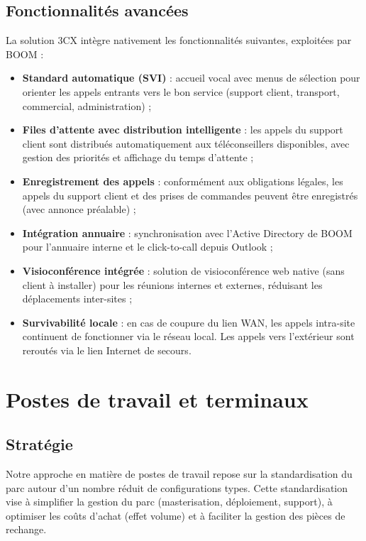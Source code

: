 \documentclass[12pt,a4paper]{report}
\begin{document}
\section{Fonctionnalités avancées}

La solution 3CX intègre nativement les fonctionnalités suivantes, exploitées par BOOM :

\begin{itemize}
\item \textbf{Standard automatique (SVI)} : accueil vocal avec menus de sélection pour orienter les appels entrants vers le bon service (support client, transport, commercial, administration) ;
\item \textbf{Files d'attente avec distribution intelligente} : les appels du support client sont distribués automatiquement aux téléconseillers disponibles, avec gestion des priorités et affichage du temps d'attente ;
\item \textbf{Enregistrement des appels} : conformément aux obligations légales, les appels du support client et des prises de commandes peuvent être enregistrés (avec annonce préalable) ;
\item \textbf{Intégration annuaire} : synchronisation avec l'Active Directory de BOOM pour l'annuaire interne et le click-to-call depuis Outlook ;
\item \textbf{Visioconférence intégrée} : solution de visioconférence web native (sans client à installer) pour les réunions internes et externes, réduisant les déplacements inter-sites ;
\item \textbf{Survivabilité locale} : en cas de coupure du lien WAN, les appels intra-site continuent de fonctionner via le réseau local. Les appels vers l'extérieur sont reroutés via le lien Internet de secours.
\end{itemize}


\chapter{Postes de travail et terminaux}

\section{Stratégie}

Notre approche en matière de postes de travail repose sur la standardisation du parc autour d'un nombre réduit de configurations types. Cette standardisation vise à simplifier la gestion du parc (masterisation, déploiement, support), à optimiser les coûts d'achat (effet volume) et à faciliter la gestion des pièces de rechange.
\end{document}
